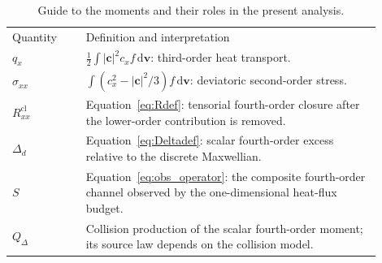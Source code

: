 \documentclass[lineno,paper]{JFM-FLM_Au}
\newcommand{\revisionbox}[1]{\colorbox{revisionyellow}{#1}}
\newcommand{\revisionbox}[1]{#1}
\newcommand{\dd}{\mathrm{d}}
\newcommand{\cl}{\mathrm{cl}}
\begin{document}
\begin{table}
\centering
\revisionbox{\begin{minipage}{0.94\textwidth}
\caption{Guide to the moments and their roles in the present analysis.}
\label{tab:revision_moment_guide}
\small
\begin{tabular}{p{0.18\linewidth}p{0.72\linewidth}}
Quantity & Definition and interpretation\\[3pt]
$q_x$ & $\frac12\int |\boldsymbol c|^2c_xf\,\dd\boldsymbol v$: third-order heat transport.\\[3pt]
$\sigma_{xx}$ & $\int(c_x^2-|\boldsymbol c|^2/3)f\,\dd\boldsymbol v$: deviatoric second-order stress.\\[3pt]
$R^{\cl}_{xx}$ & Equation~\eqref{eq:Rdef}: tensorial fourth-order closure after the lower-order contribution is removed.\\[3pt]
$\Delta_d$ & Equation~\eqref{eq:Deltadef}: scalar fourth-order excess relative to the discrete Maxwellian.\\[3pt]
$S$ & Equation~\eqref{eq:obs_operator}: the composite fourth-order channel observed by the one-dimensional heat-flux budget.\\[3pt]
$Q_\Delta$ & Collision production of the scalar fourth-order moment; its source law depends on the collision model.\\
\end{tabular}
\end{minipage}}\par
\end{table}
\end{document}
